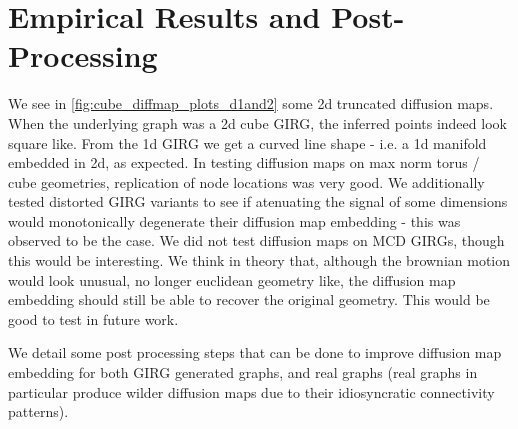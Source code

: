 \section{Empirical Results and Post-Processing}
We see in \cref{fig:cube_diffmap_plots_d1and2} some 2d truncated diffusion maps. When the underlying graph was a 2d cube GIRG, the inferred points indeed look square like. From the 1d GIRG we get a curved line shape - i.e. a 1d manifold embedded in 2d, as expected. In testing diffusion maps on max norm torus / cube geometries, replication of node locations was very good. We additionally tested distorted GIRG variants to see if atenuating the signal of some dimensions would monotonically degenerate their diffusion map embedding - this was observed to be the case. We did not test diffusion maps on MCD GIRGs, though this would be interesting. We think in theory that, although the brownian motion would look unusual, no longer euclidean geometry like, the diffusion map embedding should still be able to recover the original geometry. This would be good to test in future work. 

We detail some post processing steps that can be done to improve diffusion map embedding for both GIRG generated graphs, and real graphs (real graphs in particular produce wilder diffusion maps due to their idiosyncratic connectivity patterns).

